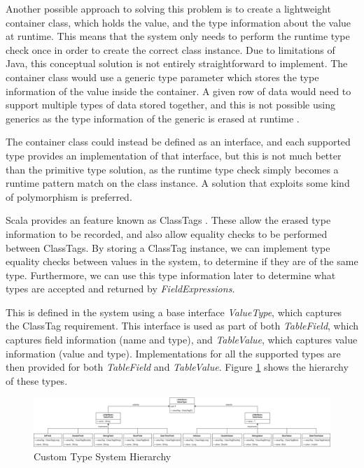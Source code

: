 Another possible approach to solving this problem is to create a lightweight container class, which holds the value, and the type information about the value at runtime. This means that the system only needs to perform the runtime type check once in order to create the correct class instance. Due to limitations of Java, this conceptual solution is not entirely straightforward to implement. The container class would use a generic type parameter which stores the type information of the value inside the container. A given row of data would need to support multiple types of data stored together, and this is not possible using generics as the type information of the generic is erased at runtime . 

The container class could instead be defined as an interface, and each supported type provides an implementation of that interface, but this is not much better than the primitive type solution, as the runtime type check simply becomes a runtime pattern match on the class instance. A solution that exploits some kind of polymorphism is preferred.

Scala provides an feature known as ClassTags . These allow the erased type information to be recorded, and also allow equality checks to be performed between ClassTags. By storing a ClassTag instance, we can implement type equality checks between values in the system, to determine if they are of the same type. Furthermore, we can use this type information later to determine what types are accepted and returned by \textit{FieldExpressions}.

This is defined in the system using a base interface \textit{ValueType}, which captures the ClassTag requirement. This interface is used as part of both \textit{TableField}, which captures field information (name and type), and \textit{TableValue}, which captures value information (value and type). Implementations for all the supported types are then provided for both \textit{TableField} and \textit{TableValue}. Figure \ref{fig:type-system-hierarchy} shows the hierarchy of these types. 

\begin{figure}[h]
	\centering
	\includegraphics[width=\textwidth]{chapters/diagrams/implementation/type-system-hierarchy}
	\caption{Custom Type System Hierarchy}
	\label{fig:type-system-hierarchy}
\end{figure}


